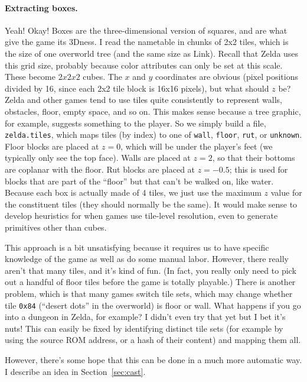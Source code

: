 \documentclass[twocolumn]{article}
\begin{document}
\paragraph{Extracting boxes.}
Yeah! Okay! Boxes are the three-dimensional version of squares, and
are what give the game its 3Dness. I read the nametable in chunks of
2x2 tiles, which is the size of one overworld tree (and the same size
as Link). Recall that Zelda uses this grid size, probably because
color attributes can only be set at this scale. These become $2x2x2$
cubes. The $x$ and $y$ coordinates are obvious (pixel positions
divided by 16, since each 2x2 tile block is 16x16 pixels), but what
should $z$ be? Zelda and other games tend to use tiles quite
consistently to represent walls, obstacles, floor, empty space, and so
on. This makes sense because a tree graphic, for example, suggests
something to the player. So we simply build a file,
\verb+zelda.tiles+, which maps tiles (by index) to one of \verb+wall+,
\verb+floor+, \verb+rut+, or \verb+unknown+. Floor blocks are placed
at $z=0$, which will be under the player's feet (we typically only see
the top face). Walls are placed at $z=2$, so that their bottoms are
coplanar with the floor. Rut blocks are placed at $z=-0.5$; this is
used for blocks that are part of the ``floor'' but that can't be
walked on, like water. Because each box is actually made of 4 tiles,
we just use the maximum $z$ value for the constituent tiles (they should
normally be the same). It would make sense to develop heuristics for
when games use tile-level resolution, even to generate primitives
other than cubes.

This approach is a bit unsatisfying because it requires us to have
specific knowledge of the game as well as do some manual labor.
However, there really aren't that many tiles, and it's kind of fun.
(In fact, you really only need to pick out a handful of floor tiles
before the game is totally playable.) There is another problem, which
is that many games switch tile sets, which may change whether tile
\verb+0x84+ (``desert dots'' in the overworld) is floor or wall. What
happens if you go into a dungeon in Zelda, for example? I didn't even
try that yet but I bet it's nuts! This can easily be fixed by
identifying distinct tile sets (for example by using the source ROM
address, or a hash of their content) and mapping them all.

However, there's some hope that this can be done in a much more
automatic way. I describe an idea in Section~\ref{sec:cast}.
\end{document}
